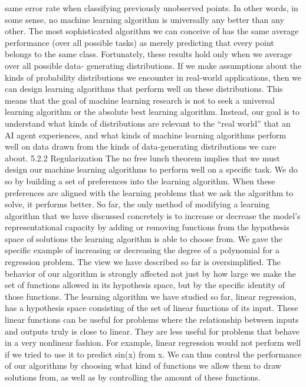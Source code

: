 \documentclass[11pt]{article}
\begin{document}
same error rate when classifying previously unobserved points. In other words,
in some sense, no machine learning algorithm is universally any better than any
other. The most sophisticated algorithm we can conceive of has the same average
performance (over all possible tasks) as merely predicting that every point belongs
to the same class.
Fortunately, these results hold only when we average over all possible data-
generating distributions. If we make assumptions about the kinds of probability
distributions we encounter in real-world applications, then we can design learning
algorithms that perform well on these distributions.
This means that the goal of machine learning research is not to seek a universal
learning algorithm or the absolute best learning algorithm. Instead, our goal is to
understand what kinds of distributions are relevant to the “real world” that an AI
agent experiences, and what kinds of machine learning algorithms perform well on
data drawn from the kinds of data-generating distributions we care about.
5.2.2 Regularization
The no free lunch theorem implies that we must design our machine learning
algorithms to perform well on a speciﬁc task. We do so by building a set of
preferences into the learning algorithm. When these preferences are aligned with
the learning problems that we ask the algorithm to solve, it performs better.
So far, the only method of modifying a learning algorithm that we have discussed
concretely is to increase or decrease the model’s representational capacity by adding
or removing functions from the hypothesis space of solutions the learning algorithm
is able to choose from.
We gave the speciﬁc example of increasing or decreasing the degree of a polynomial for a regression problem.
The view we have described so far is oversimpliﬁed.
The behavior of our algorithm is strongly aﬀected not just by how large we make the set of functions allowed in its hypothesis space, but by the speciﬁc identity of those functions.
The learning algorithm we have studied so far, linear regression, has a hypothesis space consisting of the set of linear functions of its input.
These linear functions can be useful for problems where the relationship between inputs and outputs truly is close to linear.
They are less useful for problems that behave in a very nonlinear fashion.
For example, linear regression would not perform well if we tried to use it to predict sin(x) from x.
We can thus control the performance of our algorithms by choosing what kind of functions we allow them to draw solutions from, as well as by controlling the amount of these functions.
\end{document}
